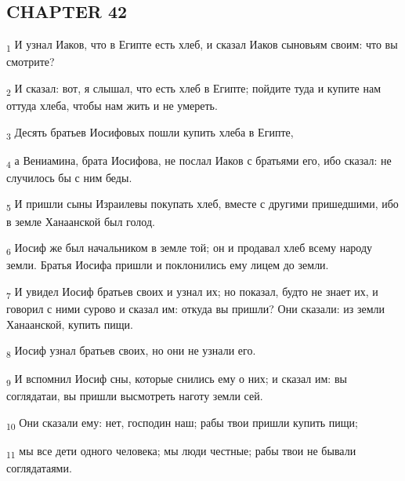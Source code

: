 \subsection{CHAPTER 42}
\begin{tcolorbox}
\textsubscript{1} И узнал Иаков, что в Египте есть хлеб, и сказал Иаков сыновьям своим: что вы смотрите?
\end{tcolorbox}
\begin{tcolorbox}
\textsubscript{2} И сказал: вот, я слышал, что есть хлеб в Египте; пойдите туда и купите нам оттуда хлеба, чтобы нам жить и не умереть.
\end{tcolorbox}
\begin{tcolorbox}
\textsubscript{3} Десять братьев Иосифовых пошли купить хлеба в Египте,
\end{tcolorbox}
\begin{tcolorbox}
\textsubscript{4} а Вениамина, брата Иосифова, не послал Иаков с братьями его, ибо сказал: не случилось бы с ним беды.
\end{tcolorbox}
\begin{tcolorbox}
\textsubscript{5} И пришли сыны Израилевы покупать хлеб, вместе с другими пришедшими, ибо в земле Ханаанской был голод.
\end{tcolorbox}
\begin{tcolorbox}
\textsubscript{6} Иосиф же был начальником в земле той; он и продавал хлеб всему народу земли. Братья Иосифа пришли и поклонились ему лицем до земли.
\end{tcolorbox}
\begin{tcolorbox}
\textsubscript{7} И увидел Иосиф братьев своих и узнал их; но показал, будто не знает их, и говорил с ними сурово и сказал им: откуда вы пришли? Они сказали: из земли Ханаанской, купить пищи.
\end{tcolorbox}
\begin{tcolorbox}
\textsubscript{8} Иосиф узнал братьев своих, но они не узнали его.
\end{tcolorbox}
\begin{tcolorbox}
\textsubscript{9} И вспомнил Иосиф сны, которые снились ему о них; и сказал им: вы соглядатаи, вы пришли высмотреть наготу земли сей.
\end{tcolorbox}
\begin{tcolorbox}
\textsubscript{10} Они сказали ему: нет, господин наш; рабы твои пришли купить пищи;
\end{tcolorbox}
\begin{tcolorbox}
\textsubscript{11} мы все дети одного человека; мы люди честные; рабы твои не бывали соглядатаями.
\end{tcolorbox}
